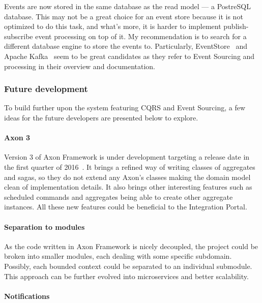 \documentclass{book}
\begin{document}
Events are now stored in the same database as the read model --- a
PostreSQL database. This may not be a great choice for an event store
because it is not optimized to do this task, and what's more, it is
harder to implement publish-subscribe event processing on top of it. My
recommendation is to search for a different database engine to store the
events to. Particularly, EventStore~\cite{eventstore} and Apache Kafka~\cite{kafka} seem to be great candidates as they refer to Event Sourcing
and processing in their overview and documentation.


\subsubsection{Future development}\label{future-development}

To build further upon the system featuring CQRS and Event Sourcing, a
few ideas for the future developers are presented below to explore.

\paragraph{Axon 3}\label{axon-3}

Version 3 of Axon Framework is under development targeting a release
date in the first quarter of 2016~\cite{axon}. It brings a refined way
of writing classes of aggregates and sagas, so they do not extend any
Axon's classes making the domain model clean of implementation details.
It also brings other interesting features such as scheduled commands and
aggregates being able to create other aggregate instances. All these new
features could be beneficial to the Integration Portal.

\paragraph{Separation to modules}\label{separation-to-modules}

As the code written in Axon Framework is nicely decoupled, the project
could be broken into smaller modules, each dealing with some specific
subdomain. Possibly, each bounded context could be separated to an
individual submodule. This approach can be further evolved into
microservices and better scalability.

\paragraph{Notifications}\label{notifications}
\end{document}
